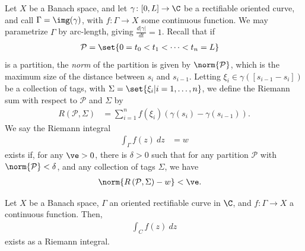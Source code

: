 \documentclass[10pt]{mypackage}
\begin{document}
Let $X$ be a Banach space, and let $\gamma\colon [0,L]\rightarrow \C$ be a rectifiable oriented curve, and call $\Gamma = \img(\gamma)$, with $f\colon \Gamma\rightarrow X$ some continuous function. We may parametrize $\Gamma$ by arc-length, giving $\frac{d\left\vert \gamma \right\vert}{dt} = 1$. Recall that if 
\begin{align*}
  \mathcal{P} &= \set{0 = t_0 < t_1 < \cdots < t_n = L}
\end{align*}
is a partition, the \textit{norm} of the partition is given by $\norm{\mathcal{P}}$, which is the maximum size of the distance between $s_i$ and $s_{i-1}$. Letting $\xi_i\in \gamma\left( \left[ s_{i-1}-s_i \right] \right)$ be a collection of tags, with $\Sigma = \set{\xi_i | i=1,\dots,n}$, we define the Riemann sum with respect to $\mathcal{P}$ and $\Sigma$ by
\begin{align*}
  R\left( \mathcal{P},\Sigma \right) &= \sum_{i=1}^{n}f\left( \xi_i \right) \left( \gamma\left( s_i \right) - \gamma\left( s_{i-1} \right) \right).
\end{align*}
We say the Riemann integral 
\begin{align*}
  \int_{\Gamma}^{} f(z)\:dz &= w
\end{align*}
exists if, for any $\ve > 0$, there is $\delta > 0$ such that for any partition $\mathcal{P}$ with $\norm{\mathcal{P}} < \delta$, and any collection of tags $\Sigma$, we have
\begin{align*}
  \norm{R\left( \mathcal{P},\Sigma \right) - w} &< \ve.
\end{align*}
\begin{theorem}
  Let $X$ be a Banach space, $\Gamma$ an oriented rectifiable curve in $\C$, and $f\colon \Gamma\rightarrow X$ a continuous function. Then,
  \begin{align*}
    \int_{C}^{} f(z)\:dz
  \end{align*}
  exists as a Riemann integral.
\end{theorem}
\end{document}
